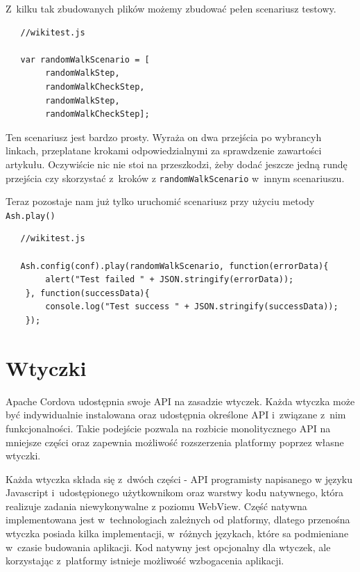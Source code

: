 \documentclass[brudnopis]{xmgr}
\begin{document}
Z~kilku tak zbudowanych plików możemy zbudować pełen scenariusz testowy.

\begin{lstlisting}
   //wikitest.js

   var randomWalkScenario = [
        randomWalkStep,
        randomWalkCheckStep,
        randomWalkStep,
        randomWalkCheckStep];

\end{lstlisting}

Ten scenariusz jest bardzo prosty. Wyraża on dwa przejścia po wybrancyh linkach, przeplatane krokami odpowiedzialnymi za sprawdzenie zawartości artykułu. Oczywiście nic nie stoi na przeszkodzi, żeby dodać jeszcze jedną rundę przejścia czy skorzystać z~kroków z \texttt{randomWalkScenario} w~innym scenariuszu.

Teraz pozostaje nam już tylko uruchomić scenariusz przy użyciu metody \texttt{Ash.play()}

\begin{lstlisting}
   //wikitest.js

   Ash.config(conf).play(randomWalkScenario, function(errorData){
        alert("Test failed " + JSON.stringify(errorData));
    }, function(successData){
        console.log("Test success " + JSON.stringify(successData));
    });

\end{lstlisting}

\chapter{Wtyczki}

Apache Cordova udostępnia swoje API na zasadzie wtyczek. Każda wtyczka może być indywidualnie instalowana oraz udostępnia określone API i~związane z~nim funkcjonalności. Takie podejście pozwala na rozbicie monolitycznego API na mniejsze części oraz zapewnia możliwość rozszerzenia platformy poprzez własne wtyczki.

Każda wtyczka składa się z~dwóch części - API programisty napisanego w języku Javascript i~udostępionego użytkownikom oraz warstwy kodu natywnego, która realizuje zadania niewykonywalne z poziomu WebView. Część natywna implementowana jest w~technologiach zależnych od platformy, dlatego przenośna wtyczka posiada kilka implementacji, w~różnych językach, które sa podmieniane w~czasie budowania aplikacji. Kod natywny jest opcjonalny dla wtyczek, ale korzystając z~platformy istnieje możliwość wzbogacenia aplikacji.
\end{document}
